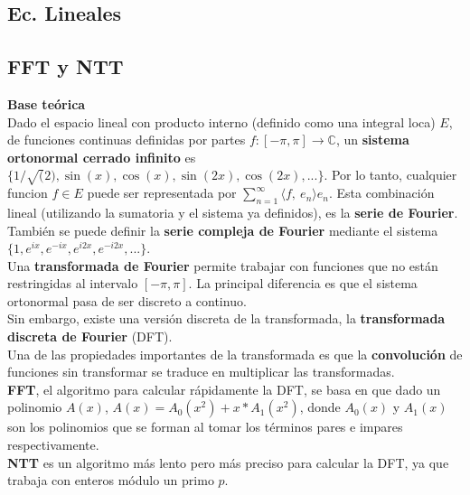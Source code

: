 {\subsection{Ec. Lineales}
\subsection{FFT y NTT}

\textbf{Base teórica} \\
Dado el espacio lineal con producto interno (definido como una integral loca) 
$E$, de funciones continuas definidas por partes $f \colon [-\pi, \pi] \rightarrow \mathbb{C}$, 
un \textbf{sistema ortonormal cerrado infinito} es $\{1/\sqrt(2), \sin(x), \cos(x), \sin(2x), 
\cos(2x), ...\}$.  Por lo tanto, cualquier funcion $f \in E$ puede ser representada por 
$\sum_{n=1}^{\infty} \langle f,\ e_n \rangle e_n$. Esta combinación lineal (utilizando
la sumatoria y el sistema ya definidos), es la \textbf{serie de Fourier}. \\ 
También se puede definir la \textbf{serie compleja de Fourier} mediante el
sistema $\{1, e^{ix}, e^{-ix}, e^{i2x}, e^{-i2x}, ...\}$. \\
Una \textbf{transformada de Fourier} permite trabajar con funciones que no están
restringidas al intervalo $[-\pi, \pi]$. La principal diferencia es que el sistema
ortonormal pasa de ser discreto a continuo. \\
Sin embargo, existe una versión discreta de la transformada, la \textbf{transformada 
discreta de Fourier} (DFT). \\
Una de las propiedades importantes de la transformada es que la \textbf{convolución} 
de funciones sin transformar se traduce en multiplicar las transformadas. \\
\textbf{FFT}, el algoritmo para calcular rápidamente la DFT, se basa en que
dado un polinomio $A(x)$, $A(x) = A_0(x^2) + x*A_1(x^2)$, donde $A_0(x)$ y $A_1(x)$ 
son los polinomios que se forman al tomar los términos pares e impares respectivamente. \\
\textbf{NTT} es un algoritmo más lento pero más preciso para calcular la DFT,
ya que trabaja con enteros módulo un primo $p$.


}
